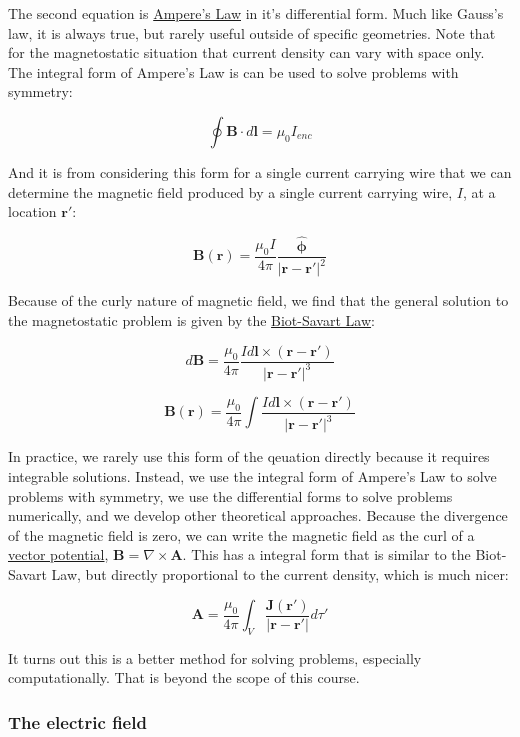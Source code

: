 The second equation is
\href{https://en.wikipedia.org/wiki/Amp\%C3\%A8re\%27s_circuital_law}{Ampere's
Law} in it's differential form. Much like Gauss's law, it is always
true, but rarely useful outside of specific geometries. Note that for
the magnetostatic situation that current density can vary with space
only. The integral form of Ampere's Law is can be used to solve problems
with symmetry:

\[\oint \mathbf{B} \cdot d\mathbf{l} = \mu_0 I_{enc}\]

And it is from considering this form for a single current carrying wire
that we can determine the magnetic field produced by a single current
carrying wire, \(I\), at a location \(\mathbf{r}'\):

\[\mathbf{B}(\mathbf{r}) = \frac{\mu_0 I}{4\pi} \frac{\hat{\mathbf{\phi}}}{|\mathbf{r} - \mathbf{r}'|^2}\]

Because of the curly nature of magnetic field, we find that the general
solution to the magnetostatic problem is given by the
\href{https://en.wikipedia.org/wiki/Biot\%E2\%80\%93Savart_law}{Biot-Savart
Law}:

\[d\mathbf{B} = \frac{\mu_0}{4\pi} \frac{I d\mathbf{l} \times (\mathbf{r} - \mathbf{r}')}{|\mathbf{r} - \mathbf{r}'|^3}\]

\[\mathbf{B}(\mathbf{r}) = \frac{\mu_0}{4\pi} \int \frac{I d\mathbf{l} \times (\mathbf{r} - \mathbf{r}')}{|\mathbf{r} - \mathbf{r}'|^3}\]

In practice, we rarely use this form of the qeuation directly because it
requires integrable solutions. Instead, we use the integral form of
Ampere's Law to solve problems with symmetry, we use the differential
forms to solve problems numerically, and we develop other theoretical
approaches. Because the divergence of the magnetic field is zero, we can
write the magnetic field as the curl of a
\href{https://en.wikipedia.org/wiki/Magnetic_vector_potential}{vector
potential}, \(\mathbf{B} = \nabla \times \mathbf{A}\). This has a
integral form that is similar to the Biot-Savart Law, but directly
proportional to the current density, which is much nicer:

\[\mathbf{A} = \frac{\mu_0}{4\pi} \int_V \frac{\mathbf{J}(\mathbf{r}')}{|\mathbf{r} - \mathbf{r}'|} d\tau'\]

It turns out this is a better method for solving problems, especially
computationally. That is beyond the scope of this course.

\subsubsection{The electric field}\label{the-electric-field-1}

